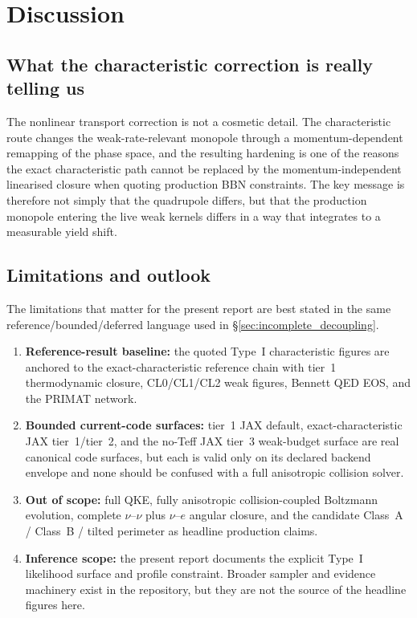 \section{Discussion}\label{sec:discussion}

\subsection{What the characteristic correction is really telling us}

The nonlinear transport correction is not a cosmetic detail.  The characteristic route changes the weak-rate-relevant monopole through a momentum-dependent remapping of the phase space, and the resulting hardening is one of the reasons the exact characteristic path cannot be replaced by the momentum-independent linearised closure when quoting production BBN constraints.  The key message is therefore not simply that the quadrupole differs, but that the production monopole entering the live weak kernels differs in a way that integrates to a measurable yield shift.

\subsection{Limitations and outlook}

The limitations that matter for the present report are best stated in the same reference/bounded/deferred language used in \S\ref{sec:incomplete_decoupling}.
\begin{enumerate}
\item \textbf{Reference-result baseline:} the quoted Type~I characteristic figures are anchored to the exact-characteristic reference chain with tier~1 thermodynamic closure, CL0/CL1/CL2 weak figures, Bennett QED EOS, and the PRIMAT network.
\item \textbf{Bounded current-code surfaces:} tier~1 JAX default, exact-characteristic JAX tier~1/tier~2, and the no-Teff JAX tier~3 weak-budget surface are real canonical code surfaces, but each is valid only on its declared backend envelope and none should be confused with a full anisotropic collision solver.
\item \textbf{Out of scope:} full QKE, fully anisotropic collision-coupled Boltzmann evolution, complete $\nu$--$\nu$ plus $\nu$--$e$ angular closure, and the candidate Class~A / Class~B / tilted perimeter as headline production claims.
\item \textbf{Inference scope:} the present report documents the explicit Type~I likelihood surface and profile constraint.  Broader sampler and evidence machinery exist in the repository, but they are not the source of the headline figures here.
\end{enumerate}


